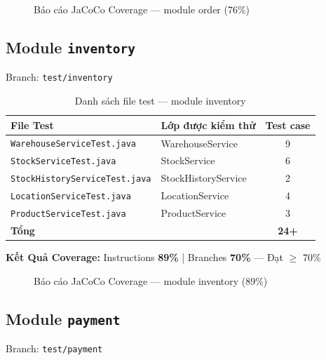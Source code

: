 \begin{figure}[H]
\centering
{}
\caption{Báo cáo JaCoCo Coverage --- module order (76\%)}
\end{figure}

\subsection{Module \texttt{inventory}}

Branch: \texttt{test/inventory}

\begin{table}[H]
\centering
\caption{Danh sách file test --- module inventory}
\begin{tabular}{|l|l|c|}
\hline
\textbf{File Test} & \textbf{Lớp được kiểm thử} & \textbf{Test case} \\
\hline
\texttt{WarehouseServiceTest.java} & WarehouseService & 9 \\
\hline
\texttt{StockServiceTest.java} & StockService & 6 \\
\hline
\texttt{StockHistoryServiceTest.java} & StockHistoryService & 2 \\
\hline
\texttt{LocationServiceTest.java} & LocationService & 4 \\
\hline
\texttt{ProductServiceTest.java} & ProductService & 3 \\
\hline
\textbf{Tổng} & & \textbf{24+} \\
\hline
\end{tabular}
\end{table}

\textbf{Kết Quả Coverage:} Instructions \textbf{89\%} | Branches \textbf{70\%} --- Đạt $\geq$ 70\%

\begin{figure}[H]
\centering
{}
\caption{Báo cáo JaCoCo Coverage --- module inventory (89\%)}
\end{figure}

\subsection{Module \texttt{payment}}

Branch: \texttt{test/payment}

